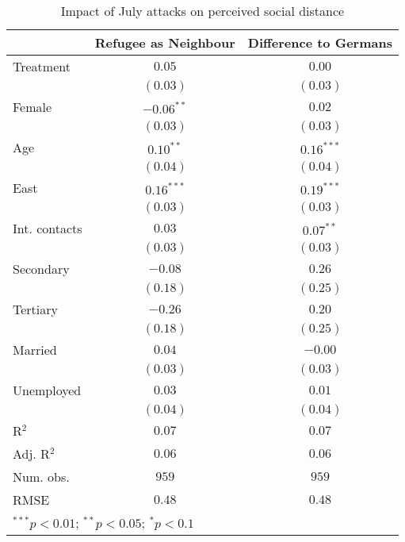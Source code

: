 
\begin{table}
\caption{Impact of July attacks on perceived social distance}
\begin{center}
\begin{tabular}{l c c}
\toprule
 & Refugee as Neighbour & Difference to Germans \\
\midrule
Treatment     & $0.05$       & $0.00$       \\
              & $(0.03)$     & $(0.03)$     \\
Female        & $-0.06^{**}$ & $0.02$       \\
              & $(0.03)$     & $(0.03)$     \\
Age           & $0.10^{**}$  & $0.16^{***}$ \\
              & $(0.04)$     & $(0.04)$     \\
East          & $0.16^{***}$ & $0.19^{***}$ \\
              & $(0.03)$     & $(0.03)$     \\
Int. contacts & $0.03$       & $0.07^{**}$  \\
              & $(0.03)$     & $(0.03)$     \\
Secondary     & $-0.08$      & $0.26$       \\
              & $(0.18)$     & $(0.25)$     \\
Tertiary      & $-0.26$      & $0.20$       \\
              & $(0.18)$     & $(0.25)$     \\
Married       & $0.04$       & $-0.00$      \\
              & $(0.03)$     & $(0.03)$     \\
Unemployed    & $0.03$       & $0.01$       \\
              & $(0.04)$     & $(0.04)$     \\
\midrule
R$^2$         & $0.07$       & $0.07$       \\
Adj. R$^2$    & $0.06$       & $0.06$       \\
Num. obs.     & $959$        & $959$        \\
RMSE          & $0.48$       & $0.48$       \\
\bottomrule
\multicolumn{3}{l}{\scriptsize{$^{***}p<0.01$; $^{**}p<0.05$; $^{*}p<0.1$}}
\end{tabular}
\label{tab_dist}
\end{center}
\end{table}
